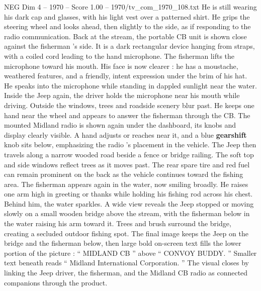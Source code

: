 \begin{textsample}{NEG Dim 4 – 1970 – Score 1.00 – 1970/tv\_com\_1970\_108.txt}
He is still wearing his dark cap and glasses, with his light vest over a patterned shirt.
He grips the steering wheel and looks ahead, then slightly to the side, as if responding to the radio communication.
Back at the stream, the portable CB unit is shown close against the fisherman ’s side.
It is a dark rectangular device hanging from straps, with a coiled cord leading to the hand microphone.
The fisherman lifts the microphone toward his mouth.
His face is now clearer : he has a moustache, weathered features, and a friendly, intent expression under the brim of his hat.
He speaks into the microphone while standing in dappled sunlight near the water.
Inside the Jeep again, the driver holds the microphone near his mouth while driving.
Outside the windows, trees and roadside scenery blur past.
He keeps one hand near the wheel and appears to answer the fisherman through the CB.
The mounted Midland radio is shown again under the dashboard, its knobs and display clearly visible.
A hand adjusts or reaches near it, and a blue \textbf{gearshift} knob sits below, emphasizing the radio ’s placement in the vehicle.
The Jeep then travels along a narrow wooded road beside a fence or bridge railing.
The soft top and side windows reflect trees as it moves past.
The rear spare tire and red fuel can remain prominent on the back as the vehicle continues toward the fishing area.
The fisherman appears again in the water, now smiling broadly.
He raises one arm high in greeting or thanks while holding his fishing rod across his chest.
Behind him, the water sparkles.
A wide view reveals the Jeep stopped or moving slowly on a small wooden bridge above the stream, with the fisherman below in the water raising his arm toward it.
Trees and brush surround the bridge, creating a secluded outdoor fishing spot.
The final image keeps the Jeep on the bridge and the fisherman below, then large bold on-screen text fills the lower portion of the picture : “ MIDLAND CB ” above “ CONVOY BUDDY. ” Smaller text beneath reads “ Midland International Corporation. ” The visual closes by linking the Jeep driver, the fisherman, and the Midland CB radio as connected companions through the product.

\end{textsample}
